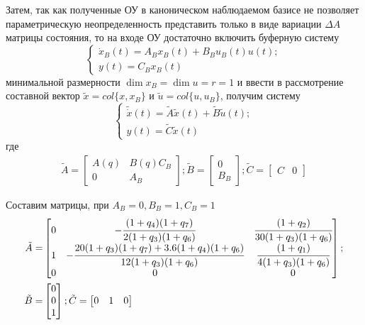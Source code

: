 Затем, так как полученные ОУ в каноническом наблюдаемом базисе не позволяет параметрическую неопределенность представить только в виде вариации $\Delta A$ матрицы
состояния, то на входе ОУ достаточно включить буферную систему~\cite{NSUsh}
\begin{equation}
	\begin{cases}
		{\dot x_B} (t) = A_B x_B(t) + B_B u_B(t) u(t);\\
		y(t) = C_B x_B(t)
	\end{cases}
\end{equation}
минимальной размерности $\dim x_B = \dim u = r = 1$ и ввести в рассмотрение составной вектор $\tilde{x} = col\{x, x_B\}$ и $\tilde{u} = col\{u, u_B\}$, получим систему
\begin{equation}
	\begin{cases}
		\tilde{\dot x} (t) = \tilde{A} \tilde{x}(t) + \tilde{B} \tilde{u}(t);\\
		y(t) = \tilde{C} \tilde{x}(t)
	\end{cases}
\end{equation}
где
\begin{align}
	\tilde{A} =
	\begin{bmatrix}
	 A(q) & B(q) C_B\\
	 0 & A_B
	\end{bmatrix};
	\tilde{B} = 
	\begin{bmatrix}
		0\\
		B_B
	\end{bmatrix};
	\tilde{C} = 
	\begin{bmatrix}
		C & 0
	\end{bmatrix}
\end{align}

Составим матрицы, при $A_B = 0, B_B = 1, C_B = 1$
\begin{align}
	\tilde{A} =&
	\begin{bmatrix}
		0 & - \cfrac{(1+q_4)(1+q_7)}{2(1+q_3)(1+q_6)} &	\cfrac{(1 + q_2)}{30(1+q_3)(1+q_6)}\\
		1 &-\cfrac{20(1+q_3)(1+q_7)+3.6(1+q_4)(1+q_6)}{12(1+q_3)(1+q_6)} & \cfrac{(1 + q_1)}{4(1+q_3)(1+q_6)} \\
		0&0&0
	\end{bmatrix};\\
	\tilde{B} =&
	\begin{bmatrix}
	0\\
	0\\
	1
	\end{bmatrix};
	\tilde{C} =
	\begin{bmatrix}
	0 & 1 & 0
	\end{bmatrix}
\end{align}

